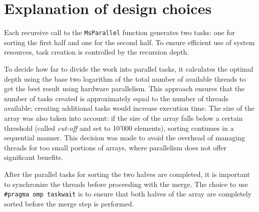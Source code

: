 \documentclass[a4paper]{article}
\begin{document}
    \section{Explanation of design choices}
    
    Each recursive call to the \texttt{MsParallel} function generates two tasks: one for sorting the first half and one for the second half. To ensure efficient use of system resources, task creation is controlled by the recursion depth.

    To decide how far to divide the work into parallel tasks, it calculates the optimal depth using the base two logarithm of the total number of available threads to get the best result using hardware parallelism. This approach ensures that the number of tasks created is approximately equal to the number of threads available; creating additional tasks would increase execution time. The size of the array was also taken into account: if the size of the array falls below a certain threshold (called \emph{cut-off} and set to 10'000 elements), sorting continues in a sequential manner. This decision was made to avoid the overhead of managing threads for too small portions of arrays, where parallelism does not offer significant benefits.

    After the parallel tasks for sorting the two halves are completed, it is important to synchronize the threads before proceeding with the merge. The choice to use \texttt{\#pragma omp taskwait} is to ensure that both halves of the array are completely sorted before the merge step is performed.
\end{document}
